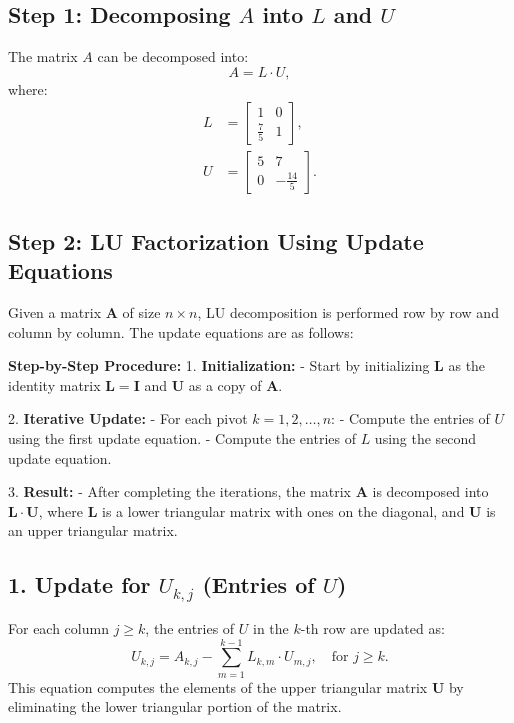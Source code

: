 \documentclass[journal]{IEEEtran}
\newcommand{\myvec}[1]{\begin{bmatrix}#1\end{bmatrix}}
\begin{document}
\subsection{Step 1: Decomposing \(A\) into \(L\) and \(U\)}
The matrix \(A\) can be decomposed into:
\begin{equation}
    A = L \cdot U,
\end{equation}
where:
\begin{align}
    L &= \myvec{1 & 0 \\ \frac{7}{5} & 1}, \\
    U &= \myvec{5 & 7 \\ 0 & -\frac{14}{5}}.
\end{align}


\subsection*{Step 2: LU Factorization Using Update Equations}
Given a matrix \( \mathbf{A} \) of size \( n \times n \), LU decomposition is performed row by row and column by column. The update equations are as follows:  

\textbf{Step-by-Step Procedure:}
1. \textbf{Initialization:}  
   - Start by initializing \( \mathbf{L} \) as the identity matrix \( \mathbf{L} = \mathbf{I} \) and \( \mathbf{U} \) as a copy of \( \mathbf{A} \).

2. \textbf{Iterative Update:}  
   - For each pivot \( k = 1, 2, \ldots, n \):  
     - Compute the entries of \( U \) using the first update equation.  
     - Compute the entries of \( L \) using the second update equation.  

3. \textbf{Result:}  
   - After completing the iterations, the matrix \( \mathbf{A} \) is decomposed into \( \mathbf{L} \cdot \mathbf{U} \), where \( \mathbf{L} \) is a lower triangular matrix with ones on the diagonal, and \( \mathbf{U} \) is an upper triangular matrix.  

\subsection*{1. Update for \( U_{k,j} \) (Entries of \( U \))}
For each column \( j \geq k \), the entries of \( U \) in the \( k \)-th row are updated as:  
\[
U_{k,j} = A_{k,j} - \sum_{m=1}^{k-1} L_{k,m} \cdot U_{m,j}, \quad \text{for } j \geq k.
\]
This equation computes the elements of the upper triangular matrix \( \mathbf{U} \) by eliminating the lower triangular portion of the matrix.
\end{document}
